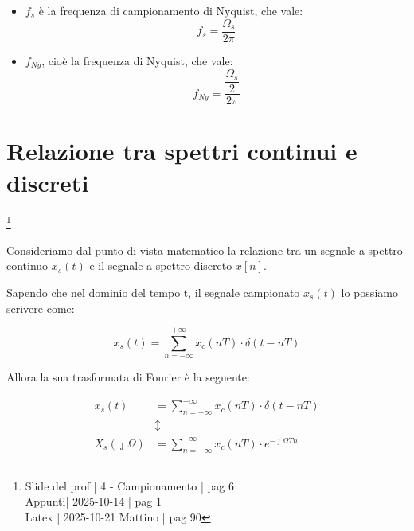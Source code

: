 \begin{itemize}
    \item $f_{s}$ è la frequenza di campionamento di Nyquist, che vale: 
    {
        \Large 
        \begin{equation}
            f_s = \dfrac{\Omega_s}{2 \pi}
        \end{equation}
    }
    \item $f_{Ny}$, cioè la frequenza di Nyquist, che vale: 
    {
        \Large 
        \begin{equation}
            f_{Ny} = \dfrac{\dfrac{\Omega_s}{2}}{2 \pi}
        \end{equation}
    }
    
\end{itemize} 

\newpage 

\section{Relazione tra spettri continui e discreti}

\footnote{ 
    Slide del prof | 4 - Campionamento | pag 6\\
    Appunti| 2025-10-14 | pag 1 \\
    Latex | 2025-10-21 Mattino | pag 90 
}   

Consideriamo dal punto di vista matematico la relazione tra 
un segnale a spettro continuo $x_s \left(t\right)$ 
e il segnale a spettro discreto $x \left[ n\right]$. \newline 

Sapendo che nel dominio del tempo t, il segnale campionato $x_s \left(t\right)$ lo possiamo scrivere come: 

{
    \Large 
    \begin{equation}
        x_s \left(t\right) 
        = 
        \sum_{n = - \infty}^{+ \infty}
        x_c \left(n T\right) \cdot \delta \left( t - nT\right)
    \end{equation}
} 

Allora la sua trasformata di Fourier è la seguente: 

{
    \Large 
    \begin{equation}
        \begin{split}
        x_s \left(t\right) 
        &= 
        \sum_{n = - \infty}^{+ \infty}
        x_c \left(n T\right) \cdot \delta \left( t - nT\right)
        \\
        &\updownarrow
        \\
        X_s \left(\jmath \Omega\right)
        &= 
        \sum_{n = -\infty}^{+ \infty}
        x_c \left(n T\right)
        \cdot 
        e^{-\jmath \Omega T n}
        \end{split}
    \end{equation}
}

